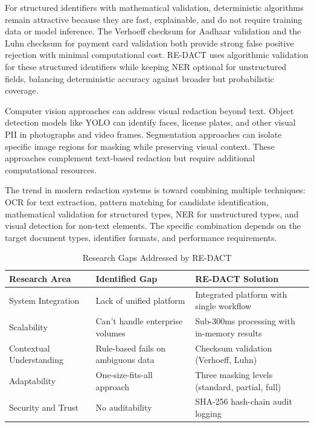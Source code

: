 \bigskip

For structured identifiers with mathematical validation, deterministic algorithms remain attractive because they are fast, explainable, and do not require training data or model inference. The Verhoeff checksum for Aadhaar validation and the Luhn checksum for payment card validation both provide strong false positive rejection with minimal computational cost. RE-DACT uses algorithmic validation for these structured identifiers while keeping NER optional for unstructured fields, balancing deterministic accuracy against broader but probabilistic coverage.

Computer vision approaches can address visual redaction beyond text. Object detection models like YOLO can identify faces, license plates, and other visual PII in photographs and video frames. Segmentation approaches can isolate specific image regions for masking while preserving visual context. These approaches complement text-based redaction but require additional computational resources.

The trend in modern redaction systems is toward combining multiple techniques: OCR for text extraction, pattern matching for candidate identification, mathematical validation for structured types, NER for unstructured types, and visual detection for non-text elements. The specific combination depends on the target document types, identifier formats, and performance requirements.

\begin{table}[htbp]
\caption{Research Gaps Addressed by RE-DACT}
\label{tab:research_gaps}
\centering
\begin{tabular}{|p{2.5cm}|p{3.5cm}|p{4cm}|}
\hline
\textbf{Research Area} & \textbf{Identified Gap} & \textbf{RE-DACT Solution} \\
\hline
System Integration & Lack of unified platform & Integrated platform with single workflow \\
\hline
Scalability & Can't handle enterprise volumes & Sub-300ms processing with in-memory results \\
\hline
Contextual Understanding & Rule-based fails on ambiguous data & Checksum validation (Verhoeff, Luhn) \\
\hline
Adaptability & One-size-fits-all approach & Three masking levels (standard, partial, full) \\
\hline
Security and Trust & No auditability & SHA-256 hash-chain audit logging \\
\hline
\end{tabular}
\end{table}

